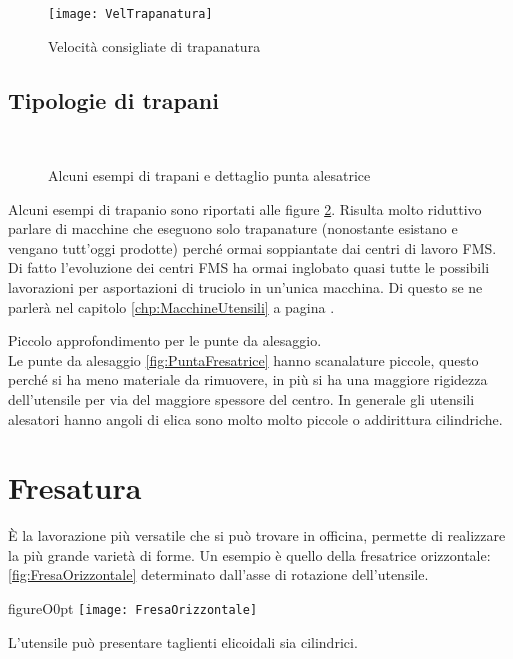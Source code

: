 \begin{figure}
\centering
\texttt{[image: VelTrapanatura]}
\caption{Velocità consigliate di trapanatura}
\label{fig:Veltrapanatura}
\end{figure}

\section{Tipologie di trapani}

\begin{figure}
\centering
{}\quad
{}\\
\caption{Alcuni esempi di trapani e dettaglio punta alesatrice}
\label{fig:Trapani}
\end{figure}
Alcuni esempi di trapanio sono riportati alle figure \ref{fig:Trapani}. Risulta molto riduttivo parlare di macchine che eseguono solo trapanature (nonostante esistano e vengano tutt'oggi prodotte) perché ormai soppiantate dai centri di lavoro \ac{FMS}.
Di fatto l'evoluzione dei centri \ac{FMS} ha ormai inglobato quasi tutte le possibili lavorazioni per asportazioni di truciolo in un'unica macchina.
Di questo se ne parlerà nel capitolo \ref{chp:MacchineUtensili} a pagina \pageref{chp:MacchineUtensili}.

Piccolo approfondimento per le punte da alesaggio.\\
Le punte da alesaggio \ref{fig:PuntaFresatrice} hanno scanalature piccole, questo perché si ha meno materiale da rimuovere, in più si ha una maggiore rigidezza dell'utensile per via del maggiore spessore del centro.
In generale gli utensili alesatori hanno angoli di elica sono molto molto piccole o addirittura cilindriche.

\chapter{Fresatura}\label{chp:Fresatura}
È la lavorazione più versatile che si può trovare in officina, permette di realizzare la più grande varietà di forme.
Un esempio è quello della fresatrice orizzontale: \ref{fig:FresaOrizzontale} determinato dall'asse di rotazione dell'utensile.
\begin{wrapfloat}{figure}{O}{0pt}
\texttt{[image: FresaOrizzontale]}
\caption{Esempio di fresatrice orizzontale}
\label{fig:FresaOrizzontale}
\end{wrapfloat}
L'utensile può presentare taglienti elicoidali sia cilindrici.

